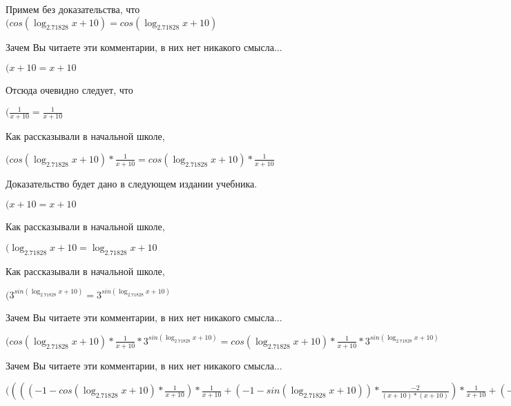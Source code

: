 \documentclass[12pt,a4paper,fleqn]{article}
\theoremstyle{definition}
\begin{document}
Примем без доказательства, что
$(cos(\log_{ 2.71828 }{ x  +  10 }) = cos(\log_{ 2.71828 }{ x  +  10 })$

Зачем Вы читаете эти комментарии, в них нет никакого смысла...

$( x  +  10  =  x  +  10 $

Отсюда очевидно следует, что

$(\frac{ 1 }{ x  +  10 }
 = \frac{ 1 }{ x  +  10 }
$

Как рассказывали в начальной школе,

$(cos(\log_{ 2.71828 }{ x  +  10 }) * \frac{ 1 }{ x  +  10 }
 = cos(\log_{ 2.71828 }{ x  +  10 }) * \frac{ 1 }{ x  +  10 }
$

Доказательство будет дано в следующем издании учебника.

$( x  +  10  =  x  +  10 $

Как рассказывали в начальной школе,

$(\log_{ 2.71828 }{ x  +  10 } = \log_{ 2.71828 }{ x  +  10 }$

Как рассказывали в начальной школе,

$({ 3 }^{sin(\log_{ 2.71828 }{ x  +  10 })} = { 3 }^{sin(\log_{ 2.71828 }{ x  +  10 })}$

Зачем Вы читаете эти комментарии, в них нет никакого смысла...

$(cos(\log_{ 2.71828 }{ x  +  10 }) * \frac{ 1 }{ x  +  10 }
 * { 3 }^{sin(\log_{ 2.71828 }{ x  +  10 })} = cos(\log_{ 2.71828 }{ x  +  10 }) * \frac{ 1 }{ x  +  10 }
 * { 3 }^{sin(\log_{ 2.71828 }{ x  +  10 })}$

Зачем Вы читаете эти комментарии, в них нет никакого смысла...

$(((( -1  - cos(\log_{ 2.71828 }{ x  +  10 }) * \frac{ 1 }{ x  +  10 }
) * \frac{ 1 }{ x  +  10 }
 + ( -1  - sin(\log_{ 2.71828 }{ x  +  10 })) * \frac{ -2 }{( x  +  10 ) * ( x  +  10 )}
) * \frac{ 1 }{ x  +  10 }
 + ( -1  - sin(\log_{ 2.71828 }{ x  +  10 })) * \frac{ 1 }{ x  +  10 }
 * \frac{ -2 }{( x  +  10 ) * ( x  +  10 )}
 + ( -1  - sin(\log_{ 2.71828 }{ x  +  10 })) * \frac{ 1 }{ x  +  10 }
 * \frac{ -2 }{( x  +  10 ) * ( x  +  10 )}
 + cos(\log_{ 2.71828 }{ x  +  10 }) * \frac{ -1  -  -2  * ( x  +  10  +  x  +  10 )}{( x  +  10 ) * ( x  +  10 ) * ( x  +  10 ) * ( x  +  10 )}
) * cos(\log_{ 2.71828 }{ x  +  10 }) * \frac{ 1 }{ x  +  10 }
 * { 3 }^{sin(\log_{ 2.71828 }{ x  +  10 })} = ((( -1  - cos(\log_{ 2.71828 }{ x  +  10 }) * \frac{ 1 }{ x  +  10 }
) * \frac{ 1 }{ x  +  10 }
 + ( -1  - sin(\log_{ 2.71828 }{ x  +  10 })) * \frac{ -2 }{( x  +  10 ) * ( x  +  10 )}
) * \frac{ 1 }{ x  +  10 }
 + ( -1  - sin(\log_{ 2.71828 }{ x  +  10 })) * \frac{ 1 }{ x  +  10 }
 * \frac{ -2 }{( x  +  10 ) * ( x  +  10 )}
 + ( -1  - sin(\log_{ 2.71828 }{ x  +  10 })) * \frac{ 1 }{ x  +  10 }
 * \frac{ -2 }{( x  +  10 ) * ( x  +  10 )}
 + cos(\log_{ 2.71828 }{ x  +  10 }) * \frac{ -1  -  -2  * ( x  +  10  +  x  +  10 )}{( x  +  10 ) * ( x  +  10 ) * ( x  +  10 ) * ( x  +  10 )}
) * cos(\log_{ 2.71828 }{ x  +  10 }) * \frac{ 1 }{ x  +  10 }
 * { 3 }^{sin(\log_{ 2.71828 }{ x  +  10 })}$
\end{document}
